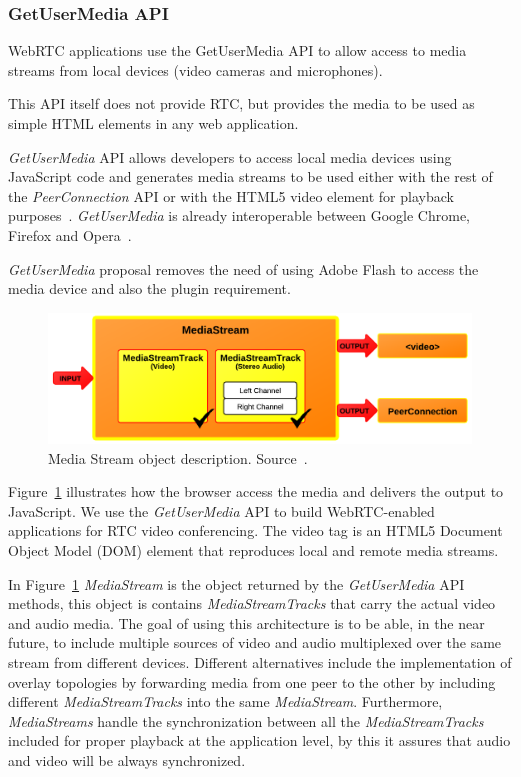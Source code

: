 \subsubsection{GetUserMedia API}
\label{sec:gum}

WebRTC applications use the GetUserMedia API to allow access to media streams from local devices (video cameras and microphones). 

This API itself does not provide RTC, but provides the media to be used as simple HTML elements in any web application. 

{\it GetUserMedia} API allows developers to access local media devices using JavaScript code and generates media streams to be used either with the rest of the {\it PeerConnection} API or with the HTML5 video element for playback purposes~\cite{getusermediaDraft}. {\it GetUserMedia} is already interoperable between Google Chrome, Firefox and Opera~\cite{chromefirefoxinterop}.

{\it GetUserMedia} proposal removes the need of using Adobe Flash to access the media device and also the plugin requirement.

 \begin{figure}[h]
  \centering
    \includegraphics[scale=1]{./figures/mediastreamAPI.png}
      \caption[Media Stream object description. Source ~\cite{getusermediaDraft}]{Media Stream object description. Source~\cite{getusermediaDraft}.}
	\label{fig:mediastreamAPI}
\end{figure}

Figure~\ref{fig:mediastreamAPI} illustrates how the browser access the media and delivers the output to JavaScript. We use the {\it GetUserMedia} API to build WebRTC-enabled applications for RTC video conferencing. The video tag is an HTML5 Document Object Model (DOM)  element that reproduces local and remote media streams.

In Figure~\ref{fig:mediastreamAPI} {\it MediaStream} is the object returned by the {\it GetUserMedia} API methods, this object is contains {\it MediaStreamTracks} that carry the actual video and audio media. The goal of using this architecture is to be able, in the near future, to include multiple sources of video and audio multiplexed over the same stream from different devices. Different alternatives include the implementation of overlay topologies by forwarding media from one peer to the other by including different {\it MediaStreamTracks} into the same {\it MediaStream}. Furthermore, {\it MediaStreams} handle the synchronization between all the {\it MediaStreamTracks} included for proper playback at the application level, by this it assures that audio and video will be always synchronized.

